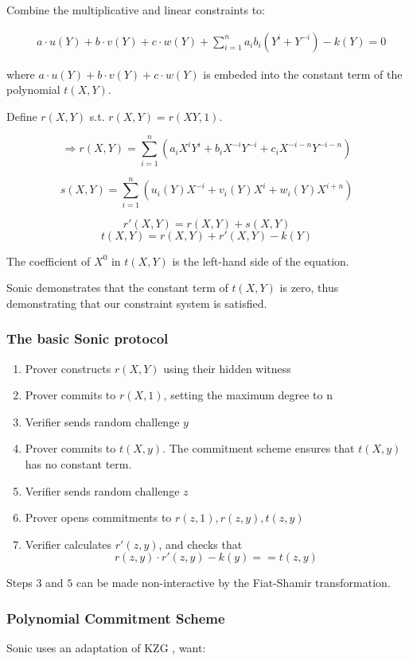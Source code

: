 \documentclass{article}
\theoremstyle{definition}
\begin{document}
Combine the multiplicative and linear constraints to:

\begin{align}
\nonumber & a \cdot u(Y) + b \cdot v(Y) + c \cdot w(Y)
+ \sum_{i=1}^n a_i b_i (Y^i + Y^{-i}) - k(Y) = 0
\end{align}

where $a \cdot u(Y) + b \cdot v(Y) + c \cdot w(Y)$ is embeded into the constant term of the polynomial $t(X, Y)$.


Define $r(X, Y)$ s.t. $r(X, Y) = r(XY, 1)$.

$$\Longrightarrow r(X, Y) = \sum_{i=1}^n (a_i X^i Y^i + b_i X^{-i} Y^{-i} + c_i X^{-i-n} Y^{-i-n})$$

$$s(X, Y) = \sum_{i=1}^n (u_i(Y) X^{-i} + v_i(Y) X^i + w_i(Y) X^{i+n})$$

$$r'(X, Y) = r(X, Y) + s(X, Y)$$
$$t(X, Y) = r(X, Y) + r'(X, Y) - k(Y)$$

The coefficient of $X^0$ in $t(X, Y)$ is the left-hand side of the equation.

Sonic demonstrates that the constant term of $t(X, Y)$ is zero, thus demonstrating that our constraint system is satisfied.


\subsubsection{The basic Sonic protocol}

\begin{enumerate}[1.]
    \item Prover constructs $r(X, Y)$ using their hidden witness
    \item Prover commits to $r(X, 1)$, setting the maximum degree to n
    \item Verifier sends random challenge $y$
    \item Prover commits to $t(X, y)$. The commitment scheme ensures that $t(X, y)$ has no constant term.
    \item Verifier sends random challenge $z$
    \item Prover opens commitments to $r(z, 1), r(z, y), t(z, y)$
    \item Verifier calculates $r'(z, y)$, and checks that
	$$r(z, y) \cdot r'(z, y) - k(y) == t(z, y)$$
\end{enumerate}

Steps $3$ and $5$ can be made non-interactive by the Fiat-Shamir transformation.

\subsubsection{Polynomial Commitment Scheme}
Sonic uses an adaptation of KZG \cite{kzg-tmp}, want:
\end{document}
